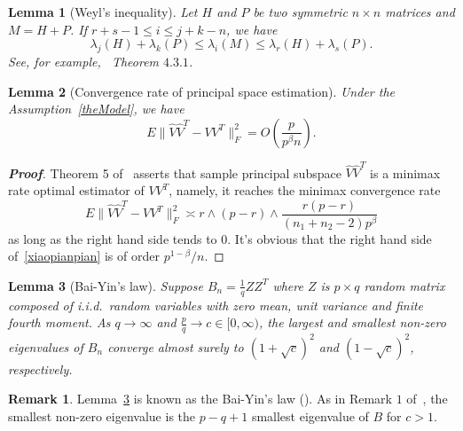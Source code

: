 \documentclass[review]{elsarticle}
\theoremstyle{plain}
\newtheorem{corollary}{\quad\quad Corollary}
\newtheorem{lemma}{\quad\quad Lemma}
\theoremstyle{definition}
\newtheorem{remark}{\quad\quad Remark}
\theoremstyle{remark}
\begin{document}
\begin{lemma}[Weyl's inequality]
Let $H$ and $P$ be two symmetric $n\times n$ matrices and $M=H+P$. If $r+s-1 \leq  i\leq j+k-n$, we have
\begin{equation*}
\lambda_j(H)+\lambda_k(P)\leq \lambda_i(M) \leq \lambda_r(H)+\lambda_s(P).
\end{equation*}
    See, for example,~\cite{Horn1985Matrix} Theorem $4.3.1$.
\end{lemma}


\begin{lemma}[Convergence rate of principal space estimation]\label{conRateLemma}
    Under the Assumption~\ref{theModel}, we have
\begin{equation*}
E\|\hat{V}\hat{V}^T-VV^T\|^2_F =O(\frac{p}{p^{\beta}n}).
\end{equation*}
\end{lemma}


\begin{proof}[\textbf{Proof}]
    Theorem 5 of~\cite{Cai2012Sparse} asserts that sample principal subspace $\hat{V}\hat{V}^T$ is a minimax rate optimal estimator of $VV^T$, namely, it reaches the minimax convergence rate
    \begin{equation}\label{xiaopianpian}
         E\|\hat{V}\hat{V}^T-VV^T\|^2_F\asymp r\wedge (p-r)\wedge \frac{r(p-r)}{(n_1+n_2-2)p^\beta}
    \end{equation}
    as long as the right hand side tends to $0$. 
    It's obvious that the right hand side of~\eqref{xiaopianpian} is of order ${p^{1-\beta}}/{n}$.
\end{proof}
\begin{lemma}[Bai-Yin's law]\label{baiyin}
    Suppose $B_n=\frac{1}{q} Z Z^T$ where $Z$ is $p\times q$ random matrix composed of i.i.d.\ random variables with zero mean, unit variance and finite fourth moment.
    As $q\to \infty$ and $\frac{p}{q}\to c\in [0,\infty)$, the largest and smallest non-zero eigenvalues of $B_n$ converge almost surely to ${(1+\sqrt{c})}^2$ and $(1-\sqrt{c})^2$, respectively.
\end{lemma}
\begin{remark}
    Lemma~\ref{baiyin} is known as the Bai-Yin's law (\cite{bai1993limit}). As in Remark $1$ of~\cite{bai1993limit}, the smallest non-zero eigenvalue is the $p-q+1$ smallest eigenvalue of $B$ for $c>1$.
\end{remark}
\end{document}
